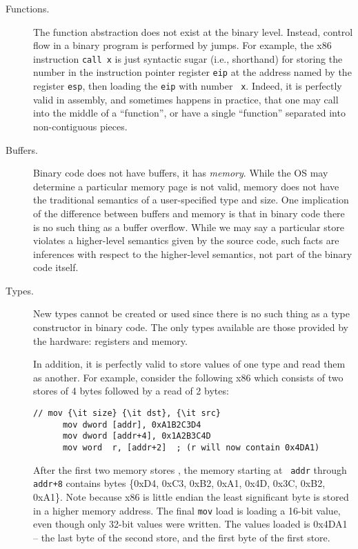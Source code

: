 \begin{description}\squish
\item[Functions.] The function abstraction does not exist at the
  binary level.  Instead, control flow in a binary program is
  performed by jumps. For example, the x86 instruction {\tt call x} is
  just syntactic sugar (i.e., shorthand) for storing the number in the
  instruction pointer register {\tt eip} at the address named by the
  register {\tt esp}, then loading the {\tt eip} with number {\tt
    x}. Indeed, it is perfectly valid in assembly, and sometimes
  happens in practice, that one may call into the middle of a
  ``function'', or have a single ``function'' separated into
  non-contiguous pieces.

\item[Buffers.]  Binary code does not have buffers, it has
  \emph{memory}.  While the OS may determine a particular memory page
  is not valid, memory does not have the traditional semantics of a
  user-specified type and size. One implication of the difference
  between buffers and memory is that in binary code there is no such
  thing as a buffer overflow. While we may say a particular store
  violates a higher-level semantics given by the source code, such
  facts are inferences with respect to the higher-level semantics, not
  part of the binary code itself.
\item[Types.] New types cannot be created or used since there is no
  such thing as a type constructor in binary code. The only types
  available are those provided by the hardware: registers and
  memory. 

  In addition, it is perfectly valid to store values of one type and
  read them as another.  For example, consider the following x86 which
  consists of two stores of 4 bytes followed by a read of 2 bytes:
    \begin{small}
    \begin{lstlisting}[mathescape=true]
      // mov {\it size} {\it dst}, {\it src}
      mov dword [addr], 0xA1B2C3D4
      mov dword [addr+4], 0x1A2B3C4D
      mov word  r, [addr+2]  ; (r will now contain 0x4DA1)
    \end{lstlisting}
    \end{small}
    After the first two memory stores , the memory starting at {\tt
      addr} through {\tt addr+8} contains bytes \{0xD4, 0xC3, 0xB2,
    0xA1, 0x4D, 0x3C, 0xB2, 0xA1\}.  Note because x86 is little endian
    the least significant byte is stored in a higher memory
    address. The final {\tt mov} load is loading a 16-bit value, even
    though only 32-bit values were written.  The values loaded is
    0x4DA1 -- the last byte of the second store, and the first byte of
    the first store.
\end{description}

